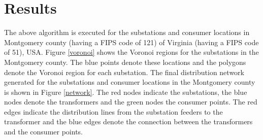 \documentclass[12pt]{amsart}
\theoremstyle{definition}
\theoremstyle{remark} \newtheorem{remark}[theorem]{Remark} %
\numberwithin{equation}{section} %
\begin{document}
	\section{Results}
	The above algorithm is executed for the substations and consumer locations in Montgomery county (having a FIPS code of 121) of Virginia (having a FIPS code of 51), USA. Figure \ref{voronoi} shows the Voronoi regions for the substations in the Montgomery county. The blue points denote these locations and the polygons denote the Voronoi region for each substation.
	The final distribution network generated for the substations and consumer locations in the Montgomery county is shown in Figure \ref{network}. The red nodes indicate the substations, the blue nodes denote the transformers and the green nodes the consumer points. The red edges indicate the distribution lines from the substation feeders to the transformer and the blue edges denote the connection between the transformers and the consumer points.
\end{document}
